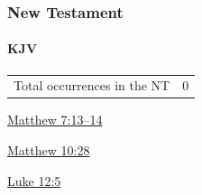 	\subsubsection{New Testament} %
		\label{NATIVEELEMENT-NT}
	
		\paragraph{KJV}
			\label{NATIVEELEMENT-NT-KJV}
			
	
			\begin{tabular}{ll}
				Total occurrences in the NT & 0
			\end{tabular}
			
			\begin{compactdesc}
				\item[{\hyperref[MATTHEW-7-13]{Matthew 7:13--14}}]
				\item[{\hyperref[MATTHEW-10-28]{Matthew 10:28}}]
				\item[{\hyperref[LUKE-12-5]{Luke 12:5}}]
			\end{compactdesc}
			
		
			
				
